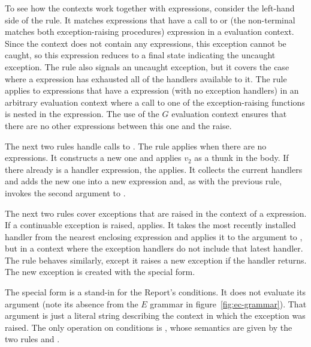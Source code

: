 To see how the contexts work together with 
expressions, consider the left-hand side of the 
rule. It matches expressions that have a call to  or
 (the non-terminal  matches
both exception-raising procedures) expression in a 
evaluation context. Since the  context does not contain any
 expressions, this exception cannot be caught, so
this expression reduces to a final state indicating the uncaught
exception. The rule  also signals an uncaught
exception, but it covers the case where a  expression
has exhausted all of the handlers available to it. The rule applies to
expressions that have a  expression (with no
exception handlers) in an arbitrary evaluation context where a call to
one of the exception-raising functions is nested in the
 expression. The use of the $G$ evaluation
context ensures that there are no other  expressions
between this one and the raise.

The next two rules handle calls to .
The  rule applies when there are no 
expressions. It constructs a new one and applies $v_2$ as a
thunk in the  body. If there already is a handler
expression, the  applies. It collects the current
handlers and adds the new one into a new  expression
and, as with the previous rule, invokes the second argument to
.

The next two rules cover exceptions that are raised in the context of
a  expression. If a continuable exception is raised,
 applies. It takes the most recently installed
handler from the nearest enclosing  expression and
applies it to the argument to , but in a
context where the exception handlers do not include that latest
handler. The  rule behaves similarly, except it
raises a new exception if the handler returns. The new exception is
created with the  special form.

The  special form is a stand-in for the Report's
conditions. It does not evaluate its argument (note its absence from
the $E$ grammar in figure~\ref{fig:ec-grammar}). That argument
is just a literal string describing the context in which the exception
was raised. The only operation on conditions is ,
whose semantics are given by the two rules  and
.

